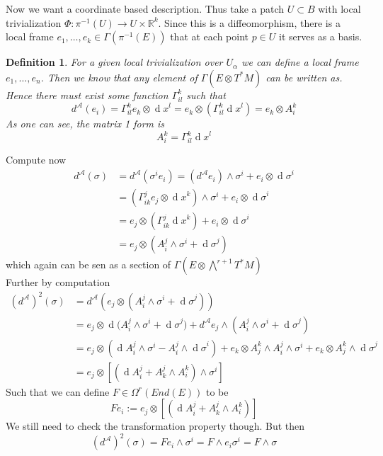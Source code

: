 \documentclass{article}
\numberwithin{theorem}{section}
\newtheorem{definition}[theorem]{Definition}
\renewcommand{\d}[1]{\ensuremath{\operatorname{d}\!{#1}}}
\newcommand{\1}{\mathds{1}}
\begin{document}
Now we want a coordinate based description. Thus take a patch $U\subset B$ 
with local trivialization $\Phi : \pi^{-1}(U) \to U \times \mathbb{R}^k$. Since this is 
a diffeomorphism, there is a local frame $e_1, \dots , e_k \in \Gamma(\pi^{-1}(E))$
that at each point $p \in U$ it serves as a basis. 
\begin{definition}
    For a given local trivialization over $U_\alpha$ we can define a local frame $e_1, \dots, e_n$. Then we know that any element of $\Gamma(E \otimes T^*M)$ can be written as. Hence there must exist some function $\Gamma^k_{il}$ such that 
    \[ d^{\mathcal{A}} (e_i) = \Gamma^{k}_{il} e_k \otimes \d x^l  = e_k \otimes (\Gamma^k_{il}\d x^l) = e_k \otimes A^k_i \]
    As one can see, the matrix 1 form is 
    \[ A^k_i = \Gamma^k_{il} \d x^l \]
\end{definition}
Compute now 
\begin{align}
    d^{\mathcal{A}}(\sigma) &= d^{\mathcal{A}}(\sigma^ie_i) = (d^{\mathcal{A}}e_i) \wedge \sigma^i + e_i \otimes \d \sigma^i \\ 
    &= (\Gamma^j_{ik}e_j \otimes \d x^k) \wedge \sigma^i + e_i \otimes \d \sigma^i \\
    &= e_j \otimes (\Gamma^j_{ik} \d x^k) + e_i \otimes \d \sigma^i \\
    &= e_j \otimes (A^j_i \wedge \sigma^i + \d \sigma^j)
\end{align}
which again can be sen as a section of $\Gamma(E \otimes \bigwedge^{r+1}T^*M)$
\\
Further by computation 
\begin{align}
    (d^{\mathcal{A}})^2(\sigma) &= d^{\mathcal{A}}(e_j \otimes (A^j_i \wedge \sigma^i + \d \sigma^j)) \\
                                &= e_j \otimes \d ( A^j_i \wedge \sigma^i + \d \sigma^j) + d^{\mathcal{A}}e_j \wedge (A^j_i \wedge \sigma^i + \d \sigma^j)\\
                                &= e_j \otimes(\d A^j_i \wedge \sigma^i - A^j_i\wedge  \d\sigma^i) + e_k \otimes A^k_j \wedge A^j_i \wedge \sigma^i + e_k \otimes A^k_j \wedge \d \sigma^j \\
                                &= e_j \otimes \left[ (\d A^j_i + A^j_k \wedge A^k_i) \wedge \sigma^i \right] 
\end{align}
Such that we can define $F \in \Omega^r(End(E))$ to be 
\[ Fe_i := e_j \otimes \left[ (\d A^j_i + A^j_k \wedge A^k_i) \right] \] 
We still need to check the transformation property though. But then 
\[ (d^{\mathcal{A}})^2(\sigma) = Fe_i  \wedge \sigma^i=F \wedge e_i\sigma^i = F \wedge \sigma  \] 
\end{document}
